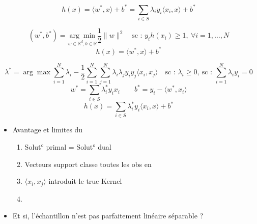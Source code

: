 \documentclass[11pt]{article}
\begin{document}

\[ h(x) = \langle w^*, x \rangle + b^* = \sum_{i \in S} \lambda_i y_i \langle x_i, x \rangle + b^* \]

\[ (w^*, b^*) = \underset{w \in \mathbb{R}^d, b \in \mathbb{R}}{\arg\min} \frac{1}{2} \|w\|^2 \quad \text{sc : } y_i h(x_i) \geq 1, \ \forall i = 1, \dots, N \]
\[ h(x) = \langle w^*, x \rangle + b^* \]

\[ \lambda^* = \arg\max \sum_{i=1}^{N} \lambda_i - \frac{1}{2} \sum_{i=1}^{N} \sum_{j=1}^{N} \lambda_i \lambda_j y_i y_j \langle x_i, x_j \rangle \quad \text{sc : } \lambda_i \geq 0, \ \text{sc : } \sum_{i=1}^{N} \lambda_i y_i = 0 \]
\[ w^* = \sum_{i \in S} \lambda_i^* y_i x_i \qquad b^* = y_i - \langle w^*, x_i \rangle \]
\[ h(x) = \sum_{i \in S} \lambda_i^* y_i \langle x_i, x \rangle + b^* \]

\begin{itemize}
\item Avantage et limites du 
\begin{enumerate}
\item Solut° primal = Solut° dual
\item Vecteurs support classe toutes les obs en 
\item $\langle x_i, x_j \rangle$ introduit le truc Kernel
\item {}
\end{enumerate}
\end{itemize}

\begin{itemize}
\item Et si, l'échantillon n'est pas parfaitement linéaire séparable ?

\end{itemize}
\end{document}
